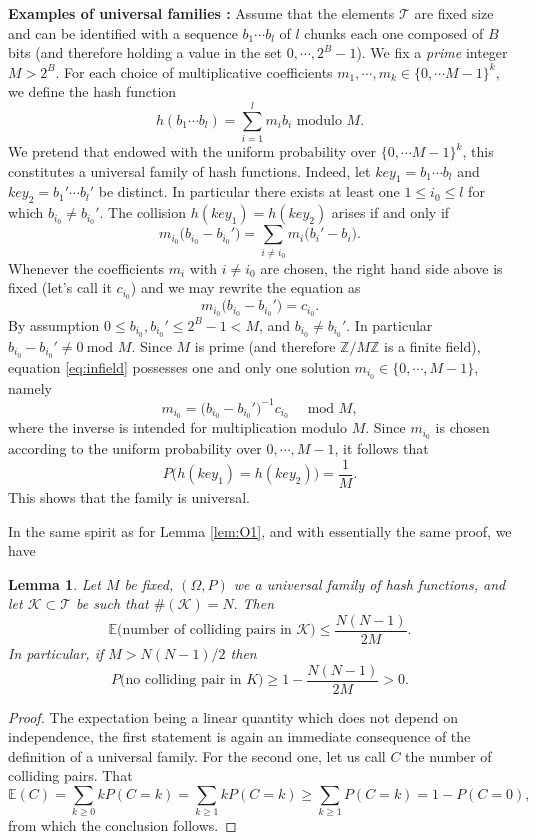 \documentclass[12pt]{article}
\theoremstyle{plain}
\newtheorem{lemma}{Lemma}
\theoremstyle{remark}
\begin{document}
\medskip
{\bf Examples of universal families :}
Assume that the elements $\mathcal{T}$ are fixed size and can be identified with  
a sequence $b_1 \cdots b_l$ of $l$ chunks each one composed of $B$ bits (and
therefore holding a value in the set $0,\cdots, 2^{B}- 1$). We fix a {\it prime} integer
$M > 2^B$. For each choice of multiplicative coefficients $m_1, \cdots, 
m_k \in \{0, \cdots M - 1\}^k,$ we define the hash function 
$$
h(b_1\cdots b_l) = \sum_{i=1}^l m_ib_i \text{ modulo } M.
$$
We pretend that endowed with the uniform probability over $\{0, \cdots M -
1\}^k$, this constitutes a universal family of hash functions. Indeed, let
$key_1 = b_1\cdots b_l$ and $key_2 = b_1'\cdots b_l'$ be distinct. In particular
there exists at least one $1 \leq i_0 \leq l$ for which $b_{i_0} \neq b_{i_0}'.$
The collision $h(key_1) = h(key_2)$ arises if and only if
$$
m_{i_0}\Big(b_{i_0} - b_{i_0}' \Big) = \sum_{i \neq i_0} m_i \Big(b_{i}' -
b_{i} \Big).
$$
Whenever the coefficients $m_i$ with $i \neq i_0$ are chosen, the right hand
side above is fixed (let's call it $c_{i_0}$) and we may rewrite the equation as
\begin{equation}\label{eq:infield}
m_{i_0}\Big(b_{i_0} - b_{i_0}' \Big) = c_{i_0}.
\end{equation}
By assumption $0 \leq b_{i_0}, b_{i_0}' \leq 2^{B} - 1 < M$, and $b_{i_0} \neq
b_{i_0}'.$ In particular $b_{i_0} - b_{i_0}' \neq 0 \ \text{mod } M.$ Since 
$M$ is prime (and therefore $\mathbb{Z}/M\mathbb{Z}$ is a finite field),
equation \eqref{eq:infield} possesses one and only one solution $m_{i_0} \in
\{0, \cdots, M-1\}$, namely
$$
m_{i_0} = \Big(b_{i_0} - b_{i_0}' \Big)^{-1} c_{i_0}\quad \text{ mod } M, 
$$
where the inverse is intended for multiplication modulo $M.$ Since $m_{i_0}$ 
is chosen according to the uniform probability over $0,\cdots, M-1$, it follows
that
$$
P\Big( h(key_1)= h(key_2)\Big) = \frac{1}{M}.
$$
This shows that the family is universal. 


\medskip

In the same spirit as for Lemma  \ref{lem:O1}, and with essentially the same
proof, we have

\begin{lemma}
	Let $M$ be fixed, $(\Omega,P)$ we a universal family of hash functions,
	and let $\mathcal{K} \subset \mathcal{T}$ be such that $\#(\mathcal{K})
	= N.$ Then
	$$
	\mathbb{E}\Big(\text{number of colliding pairs in } \mathcal{K} \Big)
	\leq \frac{N(N-1)}{2M}.
	$$
	In particular, if $M > N(N-1)/2$ then
	$$
	P\Big(\text{no colliding pair in } K\Big) \geq 1 - \frac{N(N-1)}{2M} > 0.
	$$
\end{lemma}
\begin{proof}
The expectation being a linear quantity which does not depend on independence,
the first statement is again an immediate consequence of the definition of a
universal family. For the second one, let us call $C$ the number of colliding
pairs. That
$$
	\mathbb{E}(C) = \sum_{k \geq 0} k P(C = k) = \sum_{k \geq 1} k P(C = k)
	\geq \sum_{k \geq 1} P(C = k) = 1 - P(C = 0),
$$
from which the conclusion follows.
\end{proof}
\end{document}
